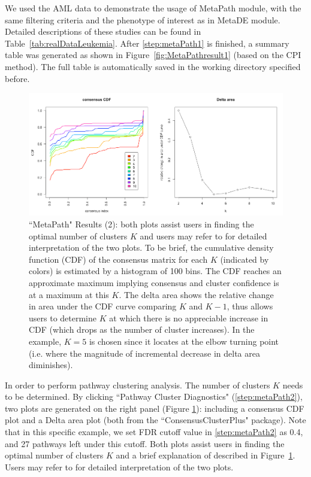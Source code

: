 We used the AML data to demonstrate the usage of MetaPath module,
with the same filtering criteria and the phenotype of interest as in MetaDE module.
Detailed descriptions of these studies can be found in Table~\ref{tab:realDataLeukemia}. 
After \ref{step:metaPath1} is finished, a summary table was generated as shown in Figure~\ref{fig:MetaPathresult1} (based on the CPI method). 
The full table is automatically saved in the working directory specified before.  

\begin{figure}[H]
\begin{center}
\includegraphics[scale=0.5]{./figure/metaPath/metaPathresult2.png}
\caption{``MetaPath" Results (2):
both plots assist users in finding the optimal number of clusters $K$ and users may refer to \cite{monti2003consensus} for detailed interpretation of the two plots. 
To be brief, the cumulative density function (CDF) of the consensus matrix for each $K$ (indicated by colors) is estimated by a histogram of 100 bins. 
The CDF reaches an approximate maximum implying consensus and cluster confidence is at a maximum at this $K$. 
The delta area shows the relative change in area under the CDF curve comparing $K$ and $K - 1$, thus allows users to determine $K$ at which there is no appreciable increase in CDF (which drops as the number of cluster increases).
In the example, $K=5$ is chosen since it locates at the elbow turning point (i.e. where the magnitude of incremental decrease in delta area diminishes).
}
\label{fig:MetaPathresult2}
\end{center}
\end{figure}

In order to perform pathway clustering analysis. 
The number of clusters $K$ needs to be determined. 
By clicking ``Pathway Cluster Diagnostics" (\ref{step:metaPath2}), 
two plots are generated on the right panel (Figure \ref{fig:MetaPathresult2}): 
including a consensus CDF plot and a Delta area plot (both from the ``ConsensusClusterPlus" package). 
Note that in this specific example, we set FDR cutoff value in \ref{step:metaPath2} as 0.4, 
and 27 pathways left under this cutoff.
Both plots assist users in finding the optimal number of clusters $K$ and 
a brief explanation of described in Figure~\ref{fig:MetaPathresult2}.
Users may refer to \cite{monti2003consensus} for detailed interpretation of the two plots. 


